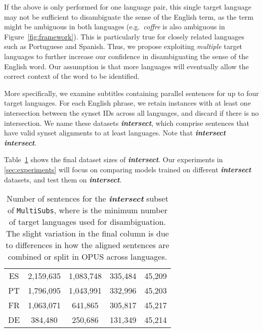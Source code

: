 \documentclass[twocolumn]{svjour3}          \smartqed  \usepackage{graphicx}
\newcommand{\multisubs}{\texttt{MultiSubs}\xspace}
\begin{document}
If the above is only performed for one language pair, this single target language may not be sufficient to disambiguate the sense of the English term, as the term might be ambiguous in both languages (e.g.\ \textit{coffre} is also ambiguous in Figure~\ref{fig:framework}). This is particularly true for closely related languages such as Portuguese and Spanish. Thus, we propose exploiting \emph{multiple} target languages to further increase our confidence in disambiguating the sense of the English word. Our assumption is that more languages will eventually allow the correct context of the word to be identified. 





More specifically, we examine subtitles containing parallel sentences for up to four target languages. For each English phrase, we retain instances with at least one intersection between the synset IDs across all  languages, and discard if there is no intersection. We name these datasets \textbf{\textit{intersect}}, which comprise sentences that have valid synset alignments to at least  languages. Note that \textbf{\textit{intersect}}  \textbf{\textit{intersect}}.

Table~\ref{tbl:stats-dataset-size} shows the final dataset sizes of \textbf{\textit{intersect}}. Our experiments in \ref{sec:experiments} will focus on comparing models trained on different \textbf{\textit{intersect}} datasets, and test them on \textbf{\textit{intersect}}. 



\begin{table}[t]
\caption{Number of sentences for the \textbf{\textit{intersect}} subset of \multisubs,    where  is the minimum number of target languages used for disambiguation. The slight variation in the final column is due to differences in how the aligned sentences are combined or split in OPUS across languages.}
	\label{tbl:stats-dataset-size}
\small
	\centering
\begin{tabular}{@{}ccccc@{}}
			\toprule
              \noalign{\smallskip}
			  &  &  &  &   \\
			\midrule
 ES & 2,159,635 & 1,083,748 & 335,484 & 45,209 \\
 PT & 1,796,095 & 1,043,991 & 332,996 & 45,203 \\
 FR & 1,063,071 & 641,865 & 305,817 & 45,217 \\
 DE & 384,480 & 250,686 & 131,349 & 45,214 \\
			\bottomrule
		\end{tabular}
\end{table}
\end{document}
